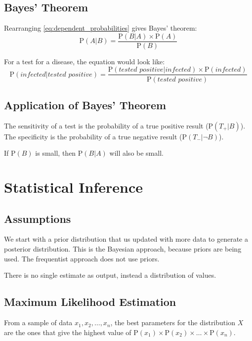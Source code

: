 \subsection{Bayes' Theorem}
Rearranging \cref{eq:dependent_probabilities} gives Bayes' theorem:
\begin{equation}
    \mathrm{P}(A|B) = \frac{\mathrm{P}(B|A) \times \mathrm{P}(A)}{\mathrm{P}(B)}
    \label{eq:bayes_theorem}
\end{equation}
\begin{example}
    For a test for a disease, the equation would look like:
    \begin{equation*}
        \mathrm{P}(infected|\textit{tested positive}) = \frac{\mathrm{P}(\textit{tested positive}|infected) \times \mathrm{P}(infected)}{\mathrm{P}(\textit{tested positive})}
    \end{equation*}
\end{example}

\subsection{Application of Bayes' Theorem}
The sensitivity of a test is the probability of a true positive result (\(\mathrm{P}(T_+|B)\)). The specificity is the probability of a true negative result (\(\mathrm{P}(T_- | \neg B)\)).

If \(\mathrm{P}(B)\) is small, then \(\mathrm{P}(B|A)\) will also be small.

\section{Statistical Inference}
\subsection{Assumptions}
We start with a prior distribution that us updated with more data to generate a posterior distribution. This is the Bayesian approach, because priors are being used. The frequentist approach does not use priors.

There is no single estimate as output, instead a distribution of values.

\subsection{Maximum Likelihood Estimation}
From a sample of data \(x_1, x_2, \dots, x_n\), the best parameters for the distribution \(X\) are the ones that give the highest value of \(\mathrm{P}(x_1) \times \mathrm{P}(x_2) \times \dots \times \mathrm{P}(x_n)\).

